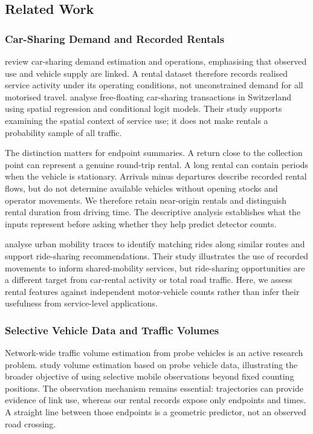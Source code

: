 \documentclass{interact}
\begin{document}
\subsection{Related Work}
\subsubsection{Car-Sharing Demand and Recorded Rentals}
\citet{jorge2013} review car-sharing demand estimation and operations, emphasising that observed use and vehicle supply are linked. A rental dataset therefore records realised service activity under its operating conditions, not unconstrained demand for all motorised travel. \citet{becker2017} analyse free-floating car-sharing transactions in Switzerland using spatial regression and conditional logit models. Their study supports examining the spatial context of service use; it does not make rentals a probability sample of all traffic.

The distinction matters for endpoint summaries. A return close to the collection point can represent a genuine round-trip rental. A long rental can contain periods when the vehicle is stationary. Arrivals minus departures describe recorded rental flows, but do not determine available vehicles without opening stocks and operator movements. We therefore retain near-origin rentals and distinguish rental duration from driving time. The descriptive analysis establishes what the inputs represent before asking whether they help predict detector counts.

\citet{bicocchi2017rides} analyse urban mobility traces to identify matching rides along similar routes and support ride-sharing recommendations. Their study illustrates the use of recorded movements to inform shared-mobility services, but ride-sharing opportunities are a different target from car-rental activity or total road traffic. Here, we assess rental features against independent motor-vehicle counts rather than infer their usefulness from service-level applications.

\subsubsection{Selective Vehicle Data and Traffic Volumes}
Network-wide traffic volume estimation from probe vehicles is an active research problem. \citet{eisinga2025} study volume estimation based on probe vehicle data, illustrating the broader objective of using selective mobile observations beyond fixed counting positions. The observation mechanism remains essential: trajectories can provide evidence of link use, whereas our rental records expose only endpoints and times. A straight line between those endpoints is a geometric predictor, not an observed road crossing.
\end{document}
